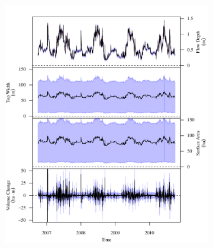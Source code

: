 \begin{linenumbers}
\subfiguretop
\begin{landscape}
	\begin{figure}
		\begin{subfigure}{0.7\textwidth}
			\centering
			\includegraphics[width=\textwidth]{"Figures/Results_USR/Stochastic/G TS A"}
			\label{sub:GeoTS_A}
		\end{subfigure}%
		\begin{subfigure}{0.7\textwidth}
			\centering

\end{subfigure}
\end{figure}
\end{landscape}
\end{linenumbers}
